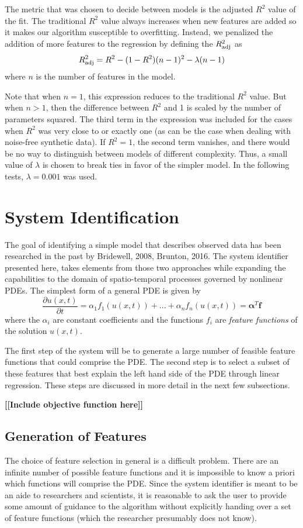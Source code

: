 \documentclass{article}
\newcommand{\todo}[1]{\textbf{[[#1]]}}
\begin{document}
The metric that was chosen to decide between models is the adjusted $R^2$ value of the fit. The traditional $R^2$ value always increases when new features are added so it makes our algorithm susceptible to overfitting. Instead, we penalized the addition of more features to the regression by defining the $R_{\rm adj}^2$ as
\[ R_{\rm adj}^2 = R^2 - (1-  R^2)(n-1)^2 - \lambda (n-1) \]
where $n$ is the number of features in the model.

Note that when $n=1$, this expression reduces to the traditional $R^2$ value. But when $n>1$, then the difference between $R^2$ and 1 is scaled by the number of parameters squared. The third term in the expression was included for the cases when $R^2$ was very close to or exactly one (as can be the case when dealing with noise-free synthetic data). If $R^2 = 1$, the second term vanishes, and there would be no way to distinguish between models of different complexity. Thus, a small value of $\lambda$ is chosen to break ties in favor of the simpler model. In the following tests, $\lambda = 0.001$ was used.


\section{System Identification}
\label{systemidentification}

The goal of identifying a simple model that describes observed data has been researched in the past by Bridewell, 2008, Brunton, 2016. The system identifier presented here, takes elements from those two approaches while expanding the capabilities to the domain of spatio-temporal processes governed by nonlinear PDEs. The simplest form of a general PDE is given by
\[ \frac{\partial u(x,t)}{\partial t} = \alpha_1 f_1(u(x,t)) + ... + \alpha_n f_n(u(x,t)) = \bm{\alpha}^T \bm{f} \]
where the $\alpha_i$ are constant coefficients and the functions $f_i$ are \textit{feature functions} of the solution $u(x,t)$.

The first step of the system will be to generate a large number of feasible feature functions that could comprise the PDE. The second step is to select a subset of these features that best explain the left hand side of the PDE through linear regression. These steps are discussed in more detail in the next few subsections.

\todo{Include objective function here}

\subsection{Generation of Features}
The choice of feature selection in general is a difficult problem. There are an infinite number of possible feature functions and it is impossible to know a priori which functions will comprise the PDE. Since the system identifier is meant to be an aide to researchers and scientists, it is reasonable to ask the user to provide some amount of guidance to the algorithm without explicitly handing over a set of feature functions (which the researcher presumably does not know).
\end{document}
